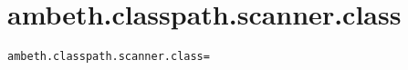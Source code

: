 \section{ambeth.classpath.scanner.class}
\label{configuration:AmbethClasspathScannerClass}
\ClearAPI
\TODO%
\begin{lstlisting}[style=Props,caption={Usage example for \textit{ambeth.classpath.scanner.class}}]
ambeth.classpath.scanner.class=
\end{lstlisting}